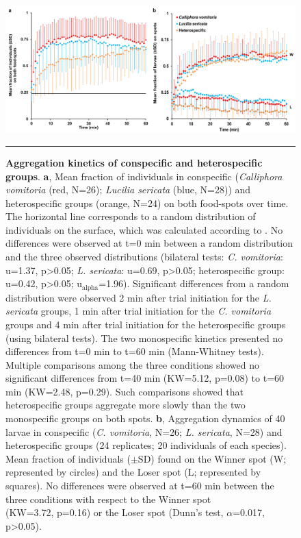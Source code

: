 \begin{figure}[ht]
\centering
		\includegraphics[width=1 \textwidth]{Figures/choix.png}
		\rule{35em}{0.5pt}
		\caption[Choix]{\textbf{Aggregation kinetics of conspecific and heterospecific groups}. \textbf{a}, Mean fraction of individuals in conspecific (\textit{Calliphora vomitoria} (red, N=26); \textit{Lucilia sericata} (blue, N=28)) and heterospecific groups (orange, N=24) on both food-spots over time. The horizontal line corresponds to a random distribution of individuals on the surface, which was calculated according to \citet{canonge_group_2011}. No differences were observed at t=0 min between a random distribution and the three observed distributions (bilateral tests: \textit{C. vomitoria}: u=1.37, p>0.05; \textit{L. sericata}: u=0.69, p>0.05; heterospecific group: u=0.42, p>0.05; $\text{u}_{\text{alpha}}$=1.96). Significant differences from a random distribution were observed 2 min after trial initiation for the \textit{L. sericata} groups, 1 min after trial initiation for the \textit{C. vomitoria} groups and 4 min after trial initiation for the heterospecific groups (using bilateral tests). The two monospecific kinetics presented no differences from t=0 min to t=60 min (Mann-Whitney tests). Multiple comparisons among the three conditions showed no significant differences from t=40 min (KW=5.12, p=0.08) to t=60 min (KW=2.48, p=0.29). Such comparisons showed that heterospecific groups aggregate more slowly than the two monospecific groups on both spots. \textbf{b}, Aggregation dynamics of 40 larvae in conspecific (\textit{C. vomitoria}, N=26; \textit{L. sericata}, N=28) and heterospecific groups (24 replicates; 20 individuals of each species). Mean fraction of individuals ($\pm$SD) found on the Winner spot (W; represented by circles) and the Loser spot (L; represented by squares). No differences were observed at t=60 min between the three conditions with respect to the Winner spot \\(KW=3.72, p=0.16) or the Loser spot (Dunn’s test, $\alpha$=0.017, p>0.05).}
	\label{fig:choix}
\end{figure}


